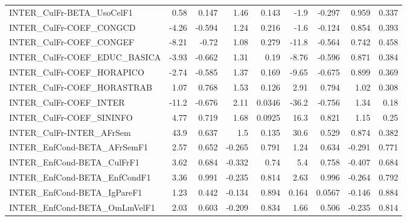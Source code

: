 \begin{tabular}{lrrrrrrrr}
INTER\_CulFr-BETA\_UsoCelF1             &        0.58 &        0.147 &    1.46 &    0.143 &       -1.9 &      -0.297 &        0.959 &         0.337 \\
INTER\_CulFr-COEF\_CONGCD               &       -4.26 &       -0.594 &    1.24 &    0.216 &       -1.6 &      -0.124 &        0.854 &         0.393 \\
INTER\_CulFr-COEF\_CONGEF               &       -8.21 &        -0.72 &    1.08 &    0.279 &      -11.8 &      -0.564 &        0.742 &         0.458 \\
INTER\_CulFr-COEF\_EDUC\_BASICA          &       -3.93 &       -0.662 &    1.31 &     0.19 &      -8.76 &      -0.596 &        0.871 &         0.384 \\
INTER\_CulFr-COEF\_HORAPICO             &       -2.74 &       -0.585 &    1.37 &    0.169 &      -9.65 &      -0.675 &        0.899 &         0.369 \\
INTER\_CulFr-COEF\_HORASTRAB            &        1.07 &        0.768 &    1.53 &    0.126 &       2.91 &       0.794 &         1.02 &         0.308 \\
INTER\_CulFr-COEF\_INTER                &       -11.2 &       -0.676 &    2.11 &   0.0346 &      -36.2 &      -0.756 &         1.34 &          0.18 \\
INTER\_CulFr-COEF\_SININFO              &        4.77 &        0.719 &    1.68 &   0.0925 &       16.3 &       0.821 &         1.15 &          0.25 \\
INTER\_CulFr-INTER\_AFrSem              &        43.9 &        0.637 &     1.5 &    0.135 &       30.6 &       0.529 &        0.874 &         0.382 \\
INTER\_EnfCond-BETA\_AFrSemF1           &        2.57 &        0.652 &  -0.265 &    0.791 &       1.24 &       0.634 &       -0.291 &         0.771 \\
INTER\_EnfCond-BETA\_CulFrF1            &        3.62 &        0.684 &  -0.332 &     0.74 &        5.4 &       0.758 &       -0.407 &         0.684 \\
INTER\_EnfCond-BETA\_EnfCondF1          &        3.36 &        0.991 &  -0.235 &    0.814 &       2.63 &       0.996 &       -0.264 &         0.792 \\
INTER\_EnfCond-BETA\_IgPareF1           &        1.23 &        0.442 &  -0.134 &    0.894 &      0.164 &      0.0567 &       -0.146 &         0.884 \\
INTER\_EnfCond-BETA\_OmLmVelF1          &        2.03 &        0.603 &  -0.209 &    0.834 &       1.66 &       0.506 &       -0.235 &         0.814 \\

\end{tabular}

